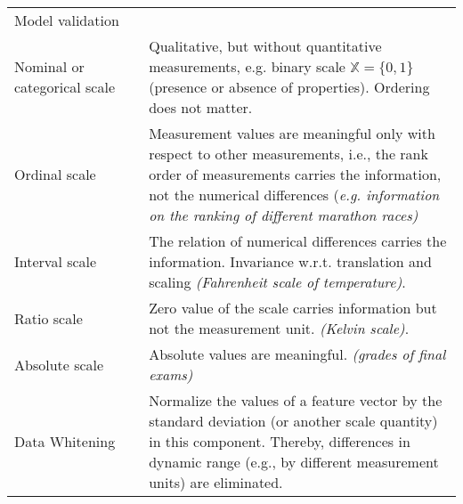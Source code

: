 \documentclass[MachineLearning]{subfiles}
\begin{document}
\begin{longtable}{p{0.3\linewidth} p{0.7\linewidth}}
Model validation & \\
Nominal or categorical scale & Qualitative, but without quantitative measurements,
e.g. binary scale \(\mathbb{X} = \{0, 1\}\) (presence or absence of
properties). Ordering does not matter.\\
Ordinal scale & Measurement values are meaningful only with respect to other measurements, i.e., the rank order of measurements carries
the information, not the numerical differences {\color{orange}(\emph{e.g. information on the ranking of different marathon races)}}\\
Interval scale &  The relation of numerical differences carries
the information. Invariance w.r.t. translation and scaling {\color{orange}\emph{(Fahrenheit scale of temperature)}}.\\
Ratio scale & Zero value of the scale carries information but not the measurement unit. {\color{orange}\emph{(Kelvin scale)}}.\\
Absolute scale & Absolute values are meaningful. {\color{orange}\emph{(grades of final exams)}}\\
Data Whitening & Normalize the values of a feature vector by the standard deviation (or another scale quantity) in this component. Thereby, differences in dynamic range (e.g., by different measurement units) are eliminated.\\
\end{longtable}
\end{document}
